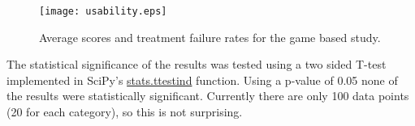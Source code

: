 \begin{figure}
        \begin{center}
        \texttt{[image: usability.eps]}
                \caption{\label{fig:usability}Average scores and treatment failure rates for the game based study.}
	\end{center}
\end{figure}

The statistical significance of the results was tested using a two sided T-test implemented
in {SciPy}'s\cite{2020SciPy-NMeth} \href{https://docs.scipy.org/doc/scipy/reference/generated/scipy.stats.ttest_ind.html}{stats.ttest{\textunderscore}ind} function.
Using a p-value of 0.05 none of the results were statistically significant. 
Currently there are only 100 data points (20 for each category), so this is not 
surprising. 


